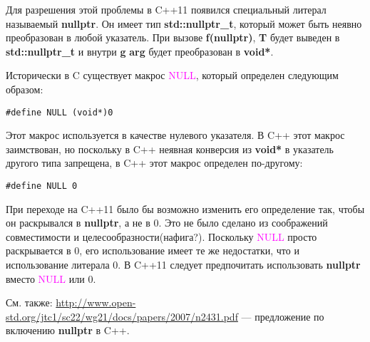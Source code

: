 Для разрешения этой проблемы в C++11 появился специальный литерал называемый {\bf nullptr}. Он имеет тип {\bf std::nullptr\_t}, который может быть неявно преобразован в любой указатель. При вызове {\bf f(nullptr)}, {\bf T} будет выведен в {\bf std::nullptr\_t} и внутри {\bf g} {\bf arg} будет преобразован в {\bf void*}.

Исторически в C существует макрос \textcolor{magenta}{NULL}, который определен следующим образом:
\begin{verbatim}
#define NULL (void*)0
\end{verbatim}
Этот макрос используется в качестве нулевого указателя. В C++ этот макрос заимствован, но поскольку в C++ неявная конверсия из {\bf void*} в указатель другого типа запрещена, в C++ этот макрос определен по-другому:
\begin{verbatim}
#define NULL 0
\end{verbatim}
При переходе на C++11 было бы возможно изменить его определение так, чтобы он раскрывался в {\bf nullptr}, а не в 0. Это не было сделано из соображений совместимости и целесообразности(нафига?).
Поскольку \textcolor{magenta}{NULL} просто раскрывается в 0, его использование имеет те же недостатки, что и использование литерала 0. В C++11 следует предпочитать использовать {\bf nullptr} вместо \textcolor{magenta}{NULL} или 0.

См. также: \url{http://www.open-std.org/jtc1/sc22/wg21/docs/papers/2007/n2431.pdf} --- предложение по включению {\bf nullptr} в C++.